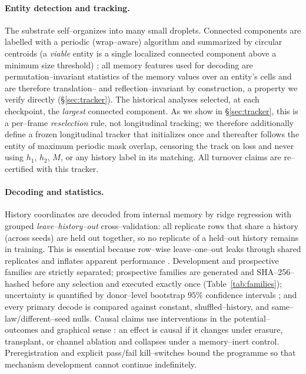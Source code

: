 \documentclass[11pt]{article}
\begin{document}
\paragraph{Entity detection and tracking.} The substrate self--organizes into many small droplets. Connected
components are labelled with a periodic (wrap--aware) algorithm and summarized by circular centroids (a \emph{viable} entity is a single localized connected component above a minimum size threshold)
\citep{rosenfeld1966}; all memory features used for decoding are permutation--invariant statistics of the memory
values over an entity's cells and are therefore translation-- and reflection--invariant by construction, a property
we verify directly (\S\ref{sec:tracker}). The historical analyses selected, at each checkpoint, the \emph{largest}
connected component. As we show in \S\ref{sec:tracker}, this is a per--frame \emph{reselection} rule, not
longitudinal tracking; we therefore additionally define a frozen longitudinal tracker that initializes once and
thereafter follows the entity of maximum periodic mask overlap, censoring the track on loss and never using $h_1$,
$h_2$, $M$, or any history label in its matching. All turnover claims are re--certified with this tracker.

\paragraph{Decoding and statistics.} History coordinates are decoded from internal memory by ridge regression with
grouped \emph{leave--history--out} cross--validation: all replicate rows that share a history (across seeds) are
held out together, so no replicate of a held--out history remains in training. This is essential because row--wise
leave--one--out leaks through shared replicates and inflates apparent performance \citep{kaufman2012}. Development
and prospective families are strictly separated; prospective families are generated and SHA--256--hashed before any
selection and executed exactly once (Table~\ref{tab:families}); uncertainty is quantified by donor--level
bootstrap $95\%$ confidence intervals \citep{efron1979}; and every primary decode is compared against constant,
shuffled--history, and same--law/different--seed nulls. Causal claims use interventions in the potential--outcomes
and graphical sense \citep{rubin1974,pearl1995,pearl2009}: an effect is causal if it changes under erasure,
transplant, or channel ablation and collapses under a memory--inert control. Preregistration and explicit
pass/fail kill--switches \citep{nosek2018,popper1959} bound the programme so that mechanism development cannot
continue indefinitely.
\end{document}
